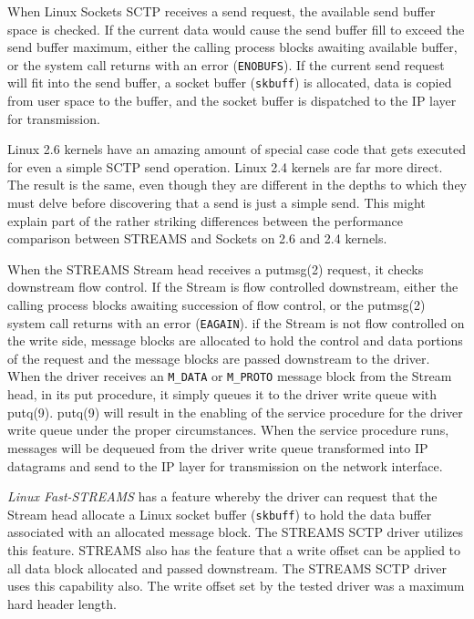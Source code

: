 \documentclass[letterpaper,final,notitlepage,twocolumn,10pt,twoside]{article}
\begin{document}
When Linux Sockets SCTP receives a send request, the available send buffer space
is checked.  If the current data would cause the send buffer fill to exceed
the send buffer maximum, either the calling process blocks awaiting available
buffer, or the system call returns with an error (\texttt{ENOBUFS}).  If the
current send request will fit into the send buffer, a socket buffer
(\texttt{skbuff}) is allocated, data is copied from user space to the buffer,
and the socket buffer is dispatched to the IP layer for transmission.

Linux 2.6 kernels have an amazing amount of special case code that gets
executed for even a simple SCTP send operation.  Linux 2.4 kernels are far more
direct.  The result is the same, even though they are different in the depths
to which they must delve before discovering that a send is just a simple send.
This might explain part of the rather striking differences between the
performance comparison between STREAMS and Sockets on 2.6 and 2.4 kernels.

When the STREAMS Stream head receives a putmsg(2) request, it checks
downstream flow control.  If the Stream is flow controlled downstream, either
the calling process blocks awaiting succession of flow control, or the
putmsg(2) system call returns with an error (\texttt{EAGAIN}).  if the Stream
is not flow controlled on the write side, message blocks are allocated to hold
the control and data portions of the request and the message blocks are passed
downstream to the driver.  When the driver receives an \texttt{M\_DATA} or
\texttt{M\_PROTO} message block from the Stream head, in its put procedure, it
simply queues it to the driver write queue with putq(9).  putq(9) will result
in the enabling of the service procedure for the driver write queue under the
proper circumstances.  When the service procedure runs, messages will be
dequeued from the driver write queue transformed into IP datagrams and send to
the IP layer for transmission on the network interface.

\textsl{Linux Fast-STREAMS} has a feature whereby the driver can request that
the Stream head allocate a Linux socket buffer (\texttt{skbuff}) to hold the
data buffer associated with an allocated message block.  The STREAMS SCTP
driver utilizes this feature.  STREAMS also has the feature that a write
offset can be applied to all data block allocated and passed downstream.  The
STREAMS SCTP driver uses this capability also.  The write offset set by the
tested driver was a maximum hard header length.
\end{document}
